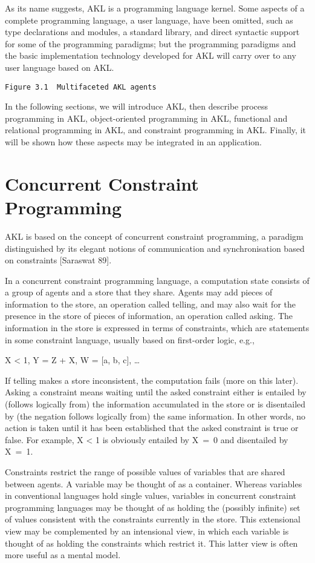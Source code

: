 As its name suggests, AKL is a programming language kernel.  Some
aspects of a complete programming language, a user language, have been
omitted, such as type declarations and modules, a standard library,
and direct syntactic support for some of the programming paradigms;
but the programming paradigms and the basic implementation technology
developed for AKL will carry over to any user language based on AKL.
                     
\verb|Figure 3.1  Multifaceted AKL agents|

In the following sections, we will introduce AKL, then describe
process programming in AKL, object-oriented programming in AKL,
functional and relational programming in AKL, and constraint
programming in AKL.  Finally, it will be shown how these aspects may be
integrated in an application.

\section{Concurrent Constraint Programming}

AKL is based on the concept of concurrent constraint programming, a 
paradigm distinguished by its elegant notions of communication and 
synchronisation based on constraints [Saraswat 89].

In a concurrent constraint programming language, a computation state
consists of a group of agents and a store that they share.  Agents may
add pieces of information to the store, an operation called telling,
and may also wait for the presence in the store of pieces of
information, an operation called asking.  The information in the store
is expressed in terms of constraints, which are statements in some
constraint language, usually based on first-order logic, e.g.,
%
\begin{progex}
X < 1,  Y = Z + X,  W = [a, b, c], \dots
\end{progex}%
%
If telling makes a store inconsistent, the computation fails (more on
this later).  Asking a constraint means waiting until the asked
constraint either is entailed by (follows logically from) the
information accumulated in the store or is disentailed by (the
negation follows logically from) the same information.  In other words,
no action is taken until it has been established that the asked
constraint is true or false.  For example, {\prog X < 1} is obviously
entailed by {\prog X~=~0} and disentailed by {\prog X~=~1}.

Constraints restrict the range of possible values of variables that
are shared between agents.  A variable may be thought of as a
container.  Whereas variables in conventional languages hold single
values, variables in concurrent constraint programming languages may
be thought of as holding the (possibly infinite) set of values
consistent with the constraints currently in the store.  This
extensional view may be complemented by an intensional view, in which
each variable is thought of as holding the constraints which restrict
it.  This latter view is often more useful as a mental model.
                                  
